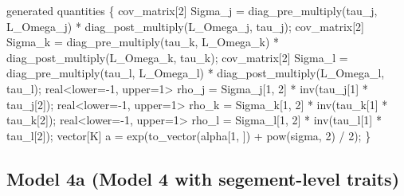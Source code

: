 \documentclass[
  12pt,
  letterpaper,
  DIV=11,
  numbers=noendperiod]{scrartcl}
\newenvironment{Shaded}{\begin{snugshade}}{\end{snugshade}}
\newcommand{\DataTypeTok}[1]{\textcolor[rgb]{0.68,0.00,0.00}{#1}}
\newcommand{\DecValTok}[1]{\textcolor[rgb]{0.68,0.00,0.00}{#1}}
\newcommand{\KeywordTok}[1]{\textcolor[rgb]{0.00,0.23,0.31}{#1}}
\newcommand{\NormalTok}[1]{\textcolor[rgb]{0.00,0.23,0.31}{#1}}
\begin{document}
\begin{Shaded}
\begin{Highlighting}[]
\KeywordTok{generated quantities}\NormalTok{ \{}
  \DataTypeTok{cov\_matrix}\NormalTok{[}\DecValTok{2}\NormalTok{] Sigma\_j = diag\_pre\_multiply(tau\_j, L\_Omega\_j) *}
\NormalTok{    diag\_post\_multiply(L\_Omega\_j\textquotesingle{}, tau\_j);}
  \DataTypeTok{cov\_matrix}\NormalTok{[}\DecValTok{2}\NormalTok{] Sigma\_k = diag\_pre\_multiply(tau\_k, L\_Omega\_k) *}
\NormalTok{    diag\_post\_multiply(L\_Omega\_k\textquotesingle{}, tau\_k);}
  \DataTypeTok{cov\_matrix}\NormalTok{[}\DecValTok{2}\NormalTok{] Sigma\_l = diag\_pre\_multiply(tau\_l, L\_Omega\_l) *}
\NormalTok{    diag\_post\_multiply(L\_Omega\_l\textquotesingle{}, tau\_l);}
  \DataTypeTok{real}\NormalTok{\textless{}}\KeywordTok{lower}\NormalTok{={-}}\DecValTok{1}\NormalTok{, }\KeywordTok{upper}\NormalTok{=}\DecValTok{1}\NormalTok{\textgreater{} rho\_j = Sigma\_j[}\DecValTok{1}\NormalTok{, }\DecValTok{2}\NormalTok{] * inv(tau\_j[}\DecValTok{1}\NormalTok{] * tau\_j[}\DecValTok{2}\NormalTok{]);}
  \DataTypeTok{real}\NormalTok{\textless{}}\KeywordTok{lower}\NormalTok{={-}}\DecValTok{1}\NormalTok{, }\KeywordTok{upper}\NormalTok{=}\DecValTok{1}\NormalTok{\textgreater{} rho\_k = Sigma\_k[}\DecValTok{1}\NormalTok{, }\DecValTok{2}\NormalTok{] * inv(tau\_k[}\DecValTok{1}\NormalTok{] * tau\_k[}\DecValTok{2}\NormalTok{]);}
  \DataTypeTok{real}\NormalTok{\textless{}}\KeywordTok{lower}\NormalTok{={-}}\DecValTok{1}\NormalTok{, }\KeywordTok{upper}\NormalTok{=}\DecValTok{1}\NormalTok{\textgreater{} rho\_l = Sigma\_l[}\DecValTok{1}\NormalTok{, }\DecValTok{2}\NormalTok{] * inv(tau\_l[}\DecValTok{1}\NormalTok{] * tau\_l[}\DecValTok{2}\NormalTok{]);}
  \DataTypeTok{vector}\NormalTok{[K] a = exp(to\_vector(alpha[}\DecValTok{1}\NormalTok{, ]) + pow(sigma, }\DecValTok{2}\NormalTok{) / }\DecValTok{2}\NormalTok{);}
\NormalTok{\}}
\end{Highlighting}
\end{Shaded}

\newpage

\subsection{Model 4a (Model 4 with segement-level
traits)}\label{model-4a-model-4-with-segement-level-traits}
\end{document}
